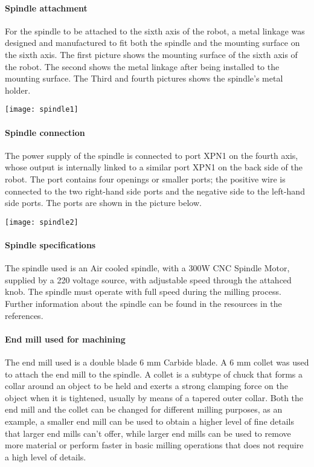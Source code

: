  \paragraph{Spindle attachment }
 For the spindle to be attached to the sixth axis of the robot, a metal linkage was designed and manufactured to fit both the spindle and the mounting surface on the sixth axis. The first picture shows the mounting surface of the sixth axis of the robot. The second shows the metal linkage after being installed to the mounting surface. The Third and fourth pictures shows the spindle’s metal holder. 
 
 \begin{center}
 	\texttt{[image: spindle1]}
 \end{center}

\paragraph{Spindle connection}
The power supply of the spindle is connected to port XPN1 on the fourth axis, whose output is internally linked to a similar port XPN1 on the back side of the robot. The port contains four openings or smaller ports; the positive wire is connected to the two right-hand side ports and the negative side to the left-hand side ports. The ports are shown in the picture below.

  \begin{center}
 	\texttt{[image: spindle2]}
 \end{center}

\paragraph{Spindle specifications }

The spindle used is an Air cooled spindle, with a 300W CNC Spindle Motor, supplied by a 220 voltage source, with adjustable speed through the attahced knob. The spindle must operate with full speed during the milling process. Further information about the spindle can be found in the resources in the references. 

\paragraph{End mill used for machining}

The end mill used is a double blade 6 mm Carbide blade. A 6 mm collet was used to attach the end mill to the spindle. A collet is a subtype of chuck that forms a collar around an object to be held and exerts a strong clamping force on the object when it is tightened, usually by means of a tapered outer collar. Both the end mill and the collet can be changed for different milling purposes, as an example, a smaller end mill can be used to obtain a higher level of fine details that larger end mills can’t offer, while larger end mills can be used to remove more material or perform faster in basic milling operations that does not require a high level of details.